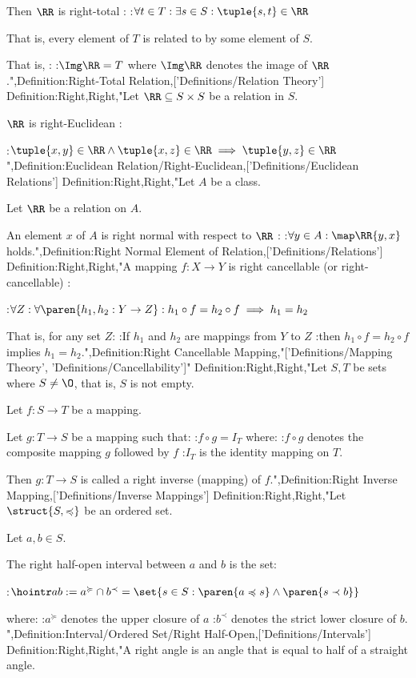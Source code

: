 Then $\RR$ is right-total :
:$\forall t \in T: \exists s \in S: \tuple {s, t} \in \RR$


That is,  every element of $T$ is related to by some element of $S$.


That is, :
:$\Img \RR = T$
where $\Img \RR$ denotes the image of $\RR$.",Definition:Right-Total Relation,['Definitions/Relation Theory']
Definition:Right,Right,"Let $\RR \subseteq S \times S$ be a relation in $S$.


$\RR$ is right-Euclidean :

:$\tuple {x, y} \in \RR \land \tuple {x, z} \in \RR \implies \tuple {y, z} \in \RR$",Definition:Euclidean Relation/Right-Euclidean,['Definitions/Euclidean Relations']
Definition:Right,Right,"Let $A$ be a class.

Let $\RR$ be a relation on $A$.


An element $x$ of $A$ is right normal with respect to $\RR$ :
:$\forall y \in A: \map \RR {y, x}$ holds.",Definition:Right Normal Element of Relation,['Definitions/Relations']
Definition:Right,Right,"A mapping $f: X \to Y$ is right cancellable (or right-cancellable) :

:$\forall Z: \forall \paren {h_1, h_2: Y \to Z}: h_1 \circ f = h_2 \circ f \implies h_1 = h_2$

That is,  for any set $Z$:
:If $h_1$ and $h_2$ are mappings from $Y$ to $Z$
:then $h_1 \circ f = h_2 \circ f$ implies $h_1 = h_2$.",Definition:Right Cancellable Mapping,"['Definitions/Mapping Theory', 'Definitions/Cancellability']"
Definition:Right,Right,"Let $S, T$ be sets where $S \ne \O$, that is, $S$ is not empty.

Let $f: S \to T$ be a mapping.


Let $g: T \to S$ be a mapping such that:
:$f \circ g = I_T$
where:
:$f \circ g$ denotes the composite mapping $g$ followed by $f$
:$I_T$ is the identity mapping on $T$.


Then $g: T \to S$ is called a right inverse (mapping) of $f$.",Definition:Right Inverse Mapping,['Definitions/Inverse Mappings']
Definition:Right,Right,"Let $\struct {S, \preccurlyeq}$ be an ordered set.

Let $a, b \in S$.


The right half-open interval between $a$ and $b$ is the set:

:$\hointr a b := a^\succcurlyeq \cap b^\prec = \set {s \in S: \paren {a \preccurlyeq s} \land \paren {s \prec b} }$

where:
:$a^\succcurlyeq$ denotes the upper closure of $a$
:$b^\prec$ denotes the strict lower closure of $b$.
",Definition:Interval/Ordered Set/Right Half-Open,['Definitions/Intervals']
Definition:Right,Right,"A right angle is an angle that is equal to half of a straight angle.


